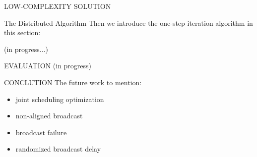 \documentclass[10pt, conference, letterpaper]{IEEEtran}
\renewcommand{\vec}{\mathbf}
\begin{document}
\begin{section}{LOW-COMPLEXITY SOLUTION}
        \begin{subsection}{The Distributed Algorithm}
            Then we introduce the one-step iteration algorithm in this section:
            \begin{algorithm}[H]
                \caption{Distributed Algorithm for $k$-th AP}
                \begin{algorithmic}
                    \WHILE{\TRUE}
                        \STATE (in progress...)
                    \ENDWHILE
                \end{algorithmic}
            \end{algorithm}
        \end{subsection}
        
    \end{section}

    \begin{section}{EVALUATION}
        \label{sec:evaluation}
        (in progress)
    \end{section}

    \begin{section}{CONCLUTION}
        \label{sec:conclusion}
        The future work to mention:
        \begin{itemize}
            \item joint scheduling optimization
            \item non-aligned broadcast
            \item broadcast failure
            \item randomized broadcast delay
        \end{itemize}
    \end{section}

    
    
\end{document}
